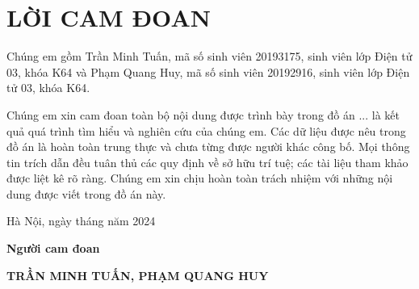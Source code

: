 \section*{LỜI CAM ĐOAN} %
\thispagestyle{empty}

Chúng em gồm Trần Minh Tuấn, mã số sinh viên 20193175, sinh viên lớp Điện tử 03, khóa K64 và Phạm Quang Huy, mã số sinh viên 20192916, sinh viên lớp Điện tử 03, khóa K64.

Chúng em xin cam đoan toàn bộ nội dung được trình bày trong đồ án ... là kết quả quá trình tìm hiểu và
nghiên cứu của chúng em. Các dữ liệu được nêu trong đồ án là hoàn toàn trung thực
và chưa từng được người khác công bố. Mọi thông tin trích dẫn đều tuân thủ các quy
định về sở hữu trí tuệ; các tài liệu tham khảo được liệt kê rõ ràng. Chúng em xin
chịu hoàn toàn trách nhiệm với những nội dung được viết trong đồ án này.


\vspace{6pt}

\hspace{8cm}Hà Nội, ngày  tháng  năm 2024

\hspace{9cm}\textbf{Người cam đoan}

\vspace{1cm}
\hspace{7cm}\textbf{TRẦN MINH TUẤN,  PHẠM QUANG HUY}

\cleardoublepage